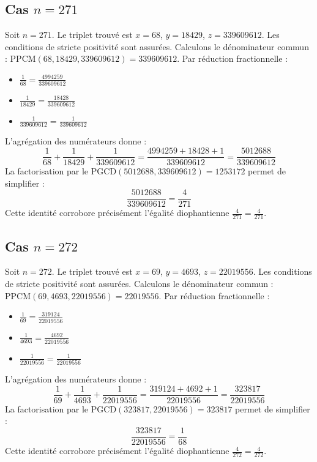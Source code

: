 \documentclass[11pt,a4paper]{article}
\begin{document}
\subsection{Cas $n = 271$}
Soit $n = 271$. Le triplet trouvé est $x = 68$, $y = 18429$, $z = 339609612$.
Les conditions de stricte positivité sont assurées.
Calculons le dénominateur commun : $\text{PPCM}(68, 18429, 339609612) = 339609612$.
Par réduction fractionnelle :
\begin{itemize}
    \item $\frac{1}{68} = \frac{4994259}{339609612}$
    \item $\frac{1}{18429} = \frac{18428}{339609612}$
    \item $\frac{1}{339609612} = \frac{1}{339609612}$
\end{itemize}
L'agrégation des numérateurs donne :
$$ \frac{1}{68} + \frac{1}{18429} + \frac{1}{339609612} = \frac{4994259 + 18428 + 1}{339609612} = \frac{5012688}{339609612} $$
La factorisation par le $\text{PGCD}(5012688, 339609612) = 1253172$ permet de simplifier :
$$ \frac{5012688}{339609612} = \frac{4}{271} $$
Cette identité corrobore précisément l'égalité diophantienne $\frac{4}{271} = \frac{4}{271}$.

\subsection{Cas $n = 272$}
Soit $n = 272$. Le triplet trouvé est $x = 69$, $y = 4693$, $z = 22019556$.
Les conditions de stricte positivité sont assurées.
Calculons le dénominateur commun : $\text{PPCM}(69, 4693, 22019556) = 22019556$.
Par réduction fractionnelle :
\begin{itemize}
    \item $\frac{1}{69} = \frac{319124}{22019556}$
    \item $\frac{1}{4693} = \frac{4692}{22019556}$
    \item $\frac{1}{22019556} = \frac{1}{22019556}$
\end{itemize}
L'agrégation des numérateurs donne :
$$ \frac{1}{69} + \frac{1}{4693} + \frac{1}{22019556} = \frac{319124 + 4692 + 1}{22019556} = \frac{323817}{22019556} $$
La factorisation par le $\text{PGCD}(323817, 22019556) = 323817$ permet de simplifier :
$$ \frac{323817}{22019556} = \frac{1}{68} $$
Cette identité corrobore précisément l'égalité diophantienne $\frac{4}{272} = \frac{4}{272}$.
\end{document}
